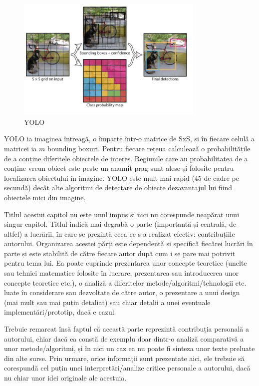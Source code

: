 \begin{figure}[h!]
    	\centering
	\captionsetup{justification=centering, margin=2cm}
	\includegraphics[width=0.8\textwidth]{figures/yolo1.png}
	\caption{YOLO \cite{rcnn_vs_fast_rcnn}}
	\label{fig:class_detect_segment}
\end{figure}
YOLO ia imaginea întreagă, o împarte într-o matrice de SxS, și în fiecare celulă a matricei ia $m$ bounding boxuri. Pentru fiecare rețeua calculează o probabilitățile de a conține diferitele obiectele de interes. Regiunile care au probabilitatea de a conține vreun obiect este peste un anumit prag sunt alese și folosite pentru localizarea obiectului în imagine.\newline
YOLO este mult mai rapid (45 de cadre pe secundă) decât alte algoritmi de detectare de obiecte dezavantajul lui fiind obiectele mici din imagine.






Titlul acestui capitol nu este unul impus și nici nu corespunde neapărat unui singur capitol. Titlul indică mai degrabă o parte (importantă și centrală, de altfel) a lucrării, în care se prezintă ceea ce s-a realizat efectiv: contribuțiile autorului. Organizarea acestei părți este dependentă și specifică fiecărei lucrări în parte și este stabilită de către fiecare autor după cum i se pare mai potrivit pentru tema lui. Ea poate cuprinde prezentarea unor concepte teoretice (unelte sau tehnici matematice folosite în lucrare, prezentarea sau introducerea unor concepte teoretice etc.), o analiză a diferitelor metode/algoritmi/tehnologii etc. luate în considerare sau dezvoltate de către autor, o prezentare a unui design (mai mult sau mai puțin detaliat) sau chiar detalii a unei eventuale implementări/prototip, dacă e cazul.

Trebuie remarcat însă faptul că această parte reprezintă contribuția personală a autorului, chiar dacă ea constă de exemplu doar dintr-o analiză comparativă a unor metode/algoritmi, și în nici un caz ea nu poate fi sinteza unor texte preluate din alte surse. Prin urmare, orice informații sunt prezentate aici, ele trebuie să corespundă cel puțin unei interpretări/analize critice personale a autorului, dacă nu chiar unor idei originale ale acestuia. 

